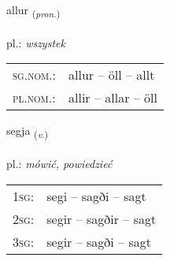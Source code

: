 \documentclass[frontgrid, backgrid]{flacards}\usepackage[]{graphicx}\usepackage[]{xcolor}
\begin{document}
\renewcommand{\blhead}{\vskip5pt {\small\bfseries\footnotesize Fornafn | Pronoun }}
\renewcommand{\bcfoot}{\vskip5pt \hspace{2pt}{\small\bfseries\footnotesize 1K}}


{allur \small{\textsubscript{(\textit{pron.})}} \\[1ex] %
\textphonetic{[atlʏr]} \\
pl.: \emph{wszystek} \\  [2ex]
\renewcommand*{\arraystretch}{0.8}
\begin{tabular}{ll}
\textsc{sg.nom.}: & allur  --  öll -- allt \\ 
\textsc{pl.nom.}: & allir -- allar -- öll
\end{tabular}
}

\renewcommand{\flhead}{\vskip5pt \fboxsep=0pt {\small\bfseries\footnotesize Sagnorð | Verb}}
\renewcommand{\fcfoot}{\vskip5pt \fboxsep=0pt \hspace{2pt}{\small\bfseries\footnotesize 1K}}

\renewcommand{\blhead}{\vskip5pt {\small\bfseries\footnotesize Sagnorð | Verb }}
\renewcommand{\bcfoot}{\vskip5pt \hspace{2pt}{\small\bfseries\footnotesize 1K}}


{segja \small{\textsubscript{(\textit{v.})}} \\[1ex] %
\textphonetic{[seija]} \\
pl.: \emph{mówić, powiedzieć} \\  [2ex]
\renewcommand*{\arraystretch}{0.8}
\begin{tabular}{p{1cm}l}
\textsc{1sg}: & segi -- sagði -- sagt \\ 
\textsc{2sg}: & segir -- sagðir -- sagt \\ 
\textsc{3sg}: & segir -- sagði -- sagt \\ 
\end{tabular}
}

\renewcommand{\flhead}{\vskip5pt \fboxsep=0pt {\small\bfseries\footnotesize Fornafn | Pronoun}}
\renewcommand{\fcfoot}{\vskip5pt \fboxsep=0pt \hspace{2pt}{\small\bfseries\footnotesize 1K}}
\end{document}
